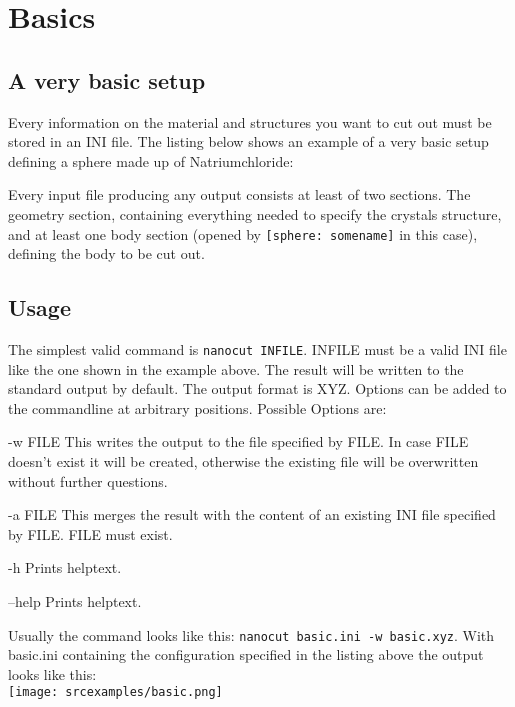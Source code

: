 \section{Basics}
\subsection{A very basic setup}

Every information on the material and structures you want to cut out must be stored in an INI file. The listing below shows an example of a very basic setup defining a sphere made up of Natriumchloride:

Every input file producing any output consists at least of two sections. The geometry section, containing everything needed to specify the crystals structure, and at least one body section (opened by \lstinline{[sphere: somename]} in this case), defining the body to be cut out.

\subsection{Usage}
The simplest valid command is \lstinline{nanocut INFILE}. INFILE must be a valid INI file like the one shown in the example above. The result will be written to the standard output by default. The output format is XYZ. Options can be added to the commandline at arbitrary positions. Possible Options are:
\begin{description}
 \item{-w FILE} This writes the output to the file specified by FILE. In case FILE doesn't exist it will be created, otherwise the existing file will be overwritten without further questions.
 \item{-a FILE} This merges the result with the content of an existing INI file specified by FILE. FILE must exist.
 \item{-h} Prints helptext.
 \item{--help} Prints helptext.
\end{description}
Usually the command looks like this: \lstinline{nanocut basic.ini -w basic.xyz}. With basic.ini containing the configuration specified in the listing above the output looks like this:
\ \\\texttt{[image: srcexamples/basic.png]}
